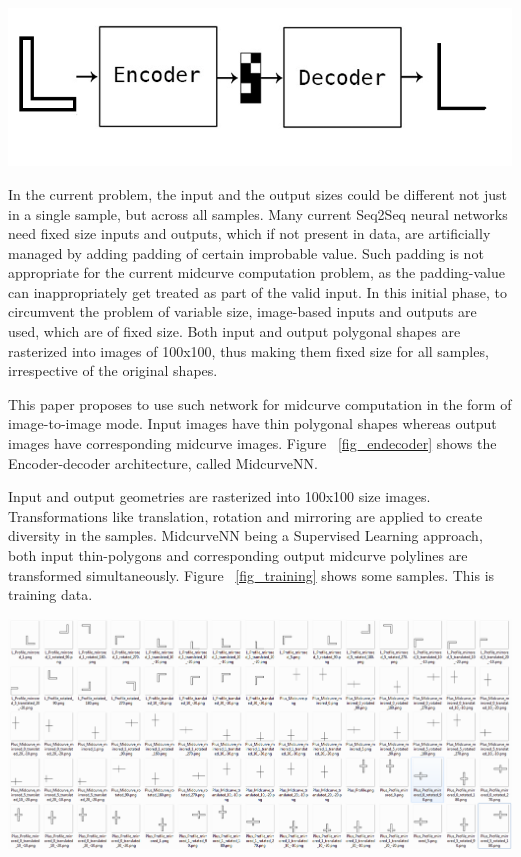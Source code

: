 \documentclass[9pt,academicons]{article}
\begin{document}
     \begin{center}
	\includegraphics[width=0.8\linewidth]{images/midcurve_encoder_decoder}
	\label{fig_endecoder}
    \end{center}
    
    
In the current problem, the input and the output sizes could be different not just in a single sample, but across all samples. Many current Seq2Seq neural networks need fixed size inputs and outputs, which if not present in data, are artificially managed by adding padding of certain improbable value. Such padding is not appropriate for the current midcurve computation problem, as the padding-value can inappropriately get treated as part of the valid input. In this initial phase, to circumvent the problem of variable size, image-based inputs and outputs are used, which are of fixed size. Both input and output polygonal shapes are rasterized into images of 100x100, thus making them fixed size for all samples, irrespective of the original shapes.

This paper proposes to use such network for midcurve computation in the form of image-to-image mode. Input images have thin polygonal shapes whereas output images have corresponding midcurve images. Figure ~\ref{fig_endecoder} shows the Encoder-decoder architecture, called MidcurveNN.


    
Input and output geometries are rasterized into 100x100 size images. Transformations like translation, rotation and mirroring are applied to create diversity in the samples. MidcurveNN being a Supervised Learning approach, both input thin-polygons and corresponding output midcurve polylines are transformed simultaneously. Figure ~\ref{fig_training} shows some samples. This is training data.    


     \begin{center}
	\includegraphics[width=\linewidth]{images/training_data}
	\label{fig_training}
    \end{center}
    
\end{document}
